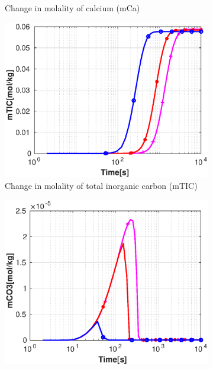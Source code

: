 \begin{figure}[!h]
\begin{subfigure}{.5\linewidth}
        \caption{Change in molality of calcium (mCa)}
        \label{fig:velmCa}       %
    \end{subfigure}%
        \hfill
    \begin{subfigure}{.5\linewidth}
        \centering
        \includegraphics[width=\textwidth]{PICTURES/with_vel_mTIC.eps}
        \caption{Change in molality of total inorganic carbon (mTIC)}
        \label{fig:velmTIC}
    \end{subfigure}%
    \hfill
    \begin{subfigure}{.5\linewidth}
        \centering
        \includegraphics[width=\textwidth]{PICTURES/with_vel_mCO3.eps}

\end{subfigure}
\end{figure}
